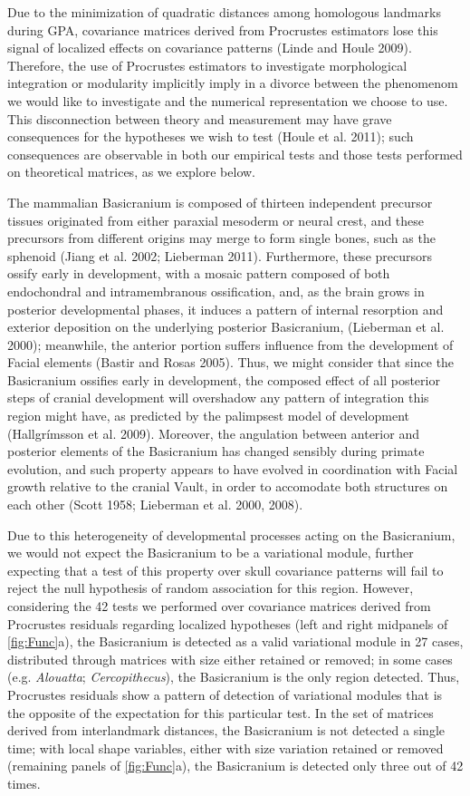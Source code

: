 \documentclass[12pt,]{article}
\begin{document}
Due to the minimization of quadratic distances among homologous
landmarks during GPA, covariance matrices derived from Procrustes
estimators lose this signal of localized effects on covariance patterns
(Linde and Houle 2009). Therefore, the use of Procrustes estimators to
investigate morphological integration or modularity implicitly imply in
a divorce between the phenomenom we would like to investigate and the
numerical representation we choose to use. This disconnection between
theory and measurement may have grave consequences for the hypotheses we
wish to test (Houle et al. 2011); such consequences are observable in
both our empirical tests and those tests performed on theoretical
matrices, as we explore below.

The mammalian Basicranium is composed of thirteen independent precursor
tissues originated from either paraxial mesoderm or neural crest, and
these precursors from different origins may merge to form single bones,
such as the sphenoid (Jiang et al. 2002; Lieberman 2011). Furthermore,
these precursors ossify early in development, with a mosaic pattern
composed of both endochondral and intramembranous ossification, and, as
the brain grows in posterior developmental phases, it induces a pattern
of internal resorption and exterior deposition on the underlying
posterior Basicranium, (Lieberman et al. 2000); meanwhile, the anterior
portion suffers influence from the development of Facial elements
(Bastir and Rosas 2005). Thus, we might consider that since the
Basicranium ossifies early in development, the composed effect of all
posterior steps of cranial development will overshadow any pattern of
integration this region might have, as predicted by the palimpsest model
of development (Hallgrímsson et al. 2009). Moreover, the angulation
between anterior and posterior elements of the Basicranium has changed
sensibly during primate evolution, and such property appears to have
evolved in coordination with Facial growth relative to the cranial
Vault, in order to accomodate both structures on each other (Scott 1958;
Lieberman et al. 2000, 2008).

Due to this heterogeneity of developmental processes acting on the
Basicranium, we would not expect the Basicranium to be a variational
module, further expecting that a test of this property over skull
covariance patterns will fail to reject the null hypothesis of random
association for this region. However, considering the 42 tests we
performed over covariance matrices derived from Procrustes residuals
regarding localized hypotheses (left and right midpanels of
\autoref{fig:Func}a), the Basicranium is detected as a valid variational
module in 27 cases, distributed through matrices with size either
retained or removed; in some cases (e.g. \emph{Alouatta};
\emph{Cercopithecus}), the Basicranium is the only region detected.
Thus, Procrustes residuals show a pattern of detection of variational
modules that is the opposite of the expectation for this particular
test. In the set of matrices derived from interlandmark distances, the
Basicranium is not detected a single time; with local shape variables,
either with size variation retained or removed (remaining panels of
\autoref{fig:Func}a), the Basicranium is detected only three out of 42
times.
\end{document}
